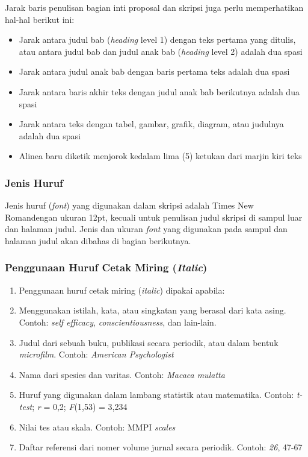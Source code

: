 \documentclass[
  indonesian,
  letterpaper,
]{scrbook}
\providecommand{\tightlist}{%
  \setlength{\itemsep}{0pt}\setlength{\parskip}{0pt}}
\begin{document}
Jarak baris penulisan bagian inti proposal dan skripsi juga perlu
memperhatikan hal-hal berikut ini:

\begin{itemize}
\tightlist
\item
  Jarak antara judul bab (\emph{heading} level 1) dengan teks pertama
  yang ditulis, atau antara judul bab dan judul anak bab (\emph{heading}
  level 2) adalah dua spasi
\item
  Jarak antara judul anak bab dengan baris pertama teks adalah dua spasi
\item
  Jarak antara baris akhir teks dengan judul anak bab berikutnya adalah
  dua spasi
\item
  Jarak antara teks dengan tabel, gambar, grafik, diagram, atau judulnya
  adalah dua spasi
\item
  Alinea baru diketik menjorok kedalam lima (5) ketukan dari marjin kiri
  teks
\end{itemize}

\subsubsection{Jenis Huruf}\label{jenis-huruf}

Jenis huruf (\emph{font}) yang digunakan dalam skripsi adalah Times New
Romandengan ukuran 12pt, kecuali untuk penulisan judul skripsi di sampul
luar dan halaman judul. Jenis dan ukuran \emph{font} yang digunakan pada
sampul dan halaman judul akan dibahas di bagian berikutnya.

\subsubsection{\texorpdfstring{Penggunaan Huruf Cetak Miring
(\emph{Italic})}{Penggunaan Huruf Cetak Miring (Italic)}}\label{penggunaan-huruf-cetak-miring-italic}

\begin{enumerate}
\def\labelenumi{\alph{enumi}.}
\tightlist
\item
  Penggunaan huruf cetak miring (\emph{italic}) dipakai apabila:
\item
  Menggunakan istilah, kata, atau singkatan yang berasal dari kata
  asing. Contoh: \emph{self efficacy}, \emph{conscientiousness}, dan
  lain-lain.
\item
  Judul dari sebuah buku, publikasi secara periodik, atau dalam bentuk
  \emph{microfilm}. Contoh: \emph{American Psychologist}
\item
  Nama dari spesies dan varitas. Contoh: \emph{Macaca mulatta}
\item
  Huruf yang digunakan dalam lambang statistik atau matematika. Contoh:
  \emph{t-test}; \emph{r} = 0,2; \emph{F}(1,53) = 3,234
\item
  Nilai tes atau skala. Contoh: MMPI \emph{scales}
\item
  Daftar referensi dari nomer volume jurnal secara periodik. Contoh:
  \emph{26}, 47-67
\end{enumerate}
\end{document}
